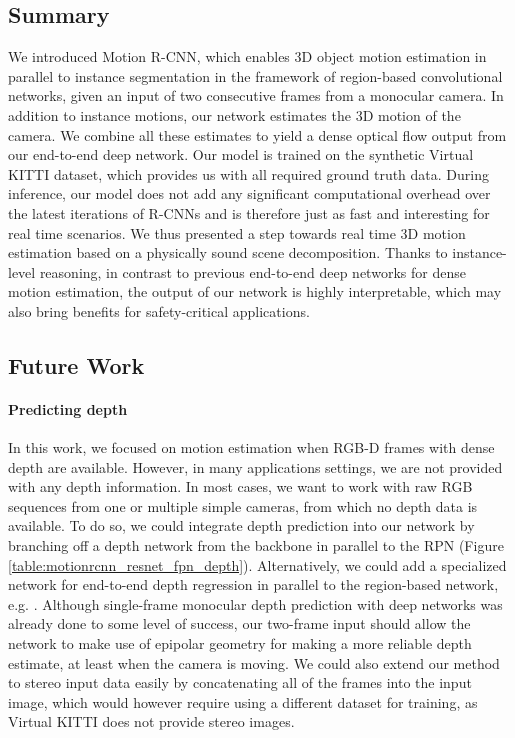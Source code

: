 \subsection{Summary}

We introduced Motion R-CNN, which enables 3D object motion estimation in parallel
to instance segmentation in the framework of region-based convolutional networks,
given an input of two consecutive frames from a monocular camera.
In addition to instance motions, our network estimates the 3D motion of the camera.
We combine all these estimates to yield a dense optical flow output from our
end-to-end deep network.
Our model is trained on the synthetic Virtual KITTI dataset, which provides
us with all required ground truth data.
During inference, our model does not add any significant computational overhead
over the latest iterations of R-CNNs and is therefore just as fast and interesting
for real time scenarios.
We thus presented a step towards real time 3D motion estimation based on a
physically sound scene decomposition. Thanks to instance-level reasoning, in contrast
to previous end-to-end deep networks for dense motion estimation, the output
of our network is highly interpretable, which may also bring benefits for safety-critical
applications.

\subsection{Future Work}
\paragraph{Predicting depth}
In this work, we focused on motion estimation when RGB-D frames with dense depth are available.
However, in many applications settings, we are not provided with any depth information.
In most cases, we want to work with raw RGB sequences from one or multiple simple cameras,
from which no depth data is available.
To do so, we could integrate depth prediction into our network by branching off a
depth network from the backbone in parallel to the RPN (Figure \ref{table:motionrcnn_resnet_fpn_depth}).
Alternatively, we could add a specialized network for end-to-end depth regression
in parallel to the region-based network, e.g. \cite{GCNet}.
Although single-frame monocular depth prediction with deep networks was already done
to some level of success,
our two-frame input should allow the network to make use of epipolar
geometry for making a more reliable depth estimate, at least when the camera
is moving. We could also extend our method to stereo input data easily by concatenating
all of the frames into the input image, which
would however require using a different dataset for training, as Virtual KITTI does not
provide stereo images.

